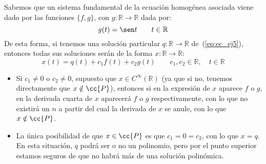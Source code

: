 \documentclass[12pt]{article}
\begin{document}
\begin{ejercicio}
\begin{enumerate}
            Sabemos que un sistema fundamental de la ecuación homogénea asociada viene dado por las funciones $\{f,g\}$, con $g:\mathbb{R}\rightarrow\mathbb{R}$ dada por:
            \begin{equation*}
                g(t) = \sen t \qquad t\in \mathbb{R}
            \end{equation*}
            De esta forma, si tenemos una solución particular $q:\mathbb{R}\rightarrow\mathbb{R}$ de~(\ref{eq:ec_ej5}), entonces todas sus soluciones serán de la forma $x:\mathbb{R}\rightarrow\mathbb{R}$:
            \begin{equation*}
                x(t) = q(t) + c_1 f(t) + c_2 g(t) \qquad c_1,c_2\in \mathbb{R}, \quad t\in \mathbb{R}
            \end{equation*}
            \begin{itemize}
                \item Si $c_1\neq 0$ o $c_2 \neq 0$, supuesto que $x\in C^\infty(\mathbb{R})$ (ya que si no, tenemos directamente que $x\notin \cc{P}$), entonces si en la expresión de $x$ aparece $f$ o $g$, en la derivada cuarta de $x$ aparecerá $f$ o $g$ respectivamente, con lo que no existirá un $n$ a partir del cual la derivada de $x$ se anule, con lo que $x\notin \cc{P}$.
                \item La única posibilidad de que $x\in \cc{P}$ es que $c_1=0=c_2$, con lo que $x = q$. En esta situación, $q$ podrá ser o no un polinomio, pero por el punto superior estamos seguros de que no habrá más de una solución polinómica.
            \end{itemize}
        \end{enumerate}
    \end{ejercicio}
\end{document}
